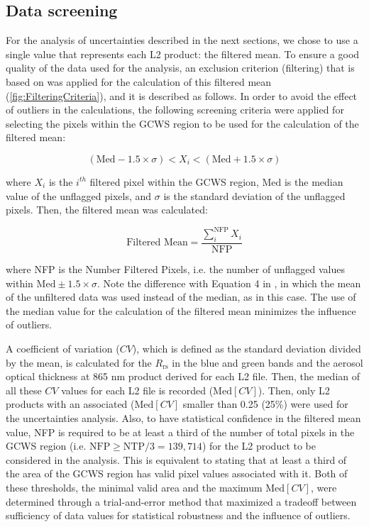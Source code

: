 \documentclass[remotesensing,article,submit,moreauthors,pdftex,10pt,a4paper]{Definitions/mdpi}
\begin{document}
\subsection{Data screening}
For the analysis of uncertainties described in the next sections, we chose to use a single value that represents each L2 product: the filtered mean. To ensure a good quality of the data used for the analysis, an exclusion criterion (filtering) that is based on \cite{Bailey2006} was applied for the calculation of this filtered mean (\autoref{fig:FilteringCriteria}), and it is described as follows. In order to avoid the effect of outliers in the calculations, the following screening criteria were applied for selecting the pixels within the GCWS region to be used for the calculation of the filtered mean: 
\begin{linenomath*}
\begin{equation}\label{eq:filtered_value}
  (\text{Med}-1.5\times\sigma) <  X_i < (\text{Med}+1.5\times\sigma)
\end{equation}
\end{linenomath*}
where $X_i$ is the $i^{th}$ filtered pixel within the GCWS region, $\text{Med}$ is the median value of the unflagged pixels, and $\sigma$ is the standard deviation of the unflagged pixels. Then, the filtered mean was calculated: 
\begin{linenomath*}
\begin{equation}\label{eq:filtered_mean}
  \text{Filtered Mean} =\frac{\displaystyle \sum_i^\text{NFP} X_i}{\text{NFP}}
\end{equation}
\end{linenomath*}
where NFP is the Number Filtered Pixels, i.e. the number of unflagged values within $\text{Med}\pm 1.5\times\sigma$. Note the difference with Equation 4 in \cite{Bailey2006}, in which the mean of the unfiltered data was used instead of the median, as in this case. The use of the median value for the calculation of the filtered mean minimizes the influence of outliers.

A coefficient of variation ($CV$), which is defined as the standard deviation divided by the mean, is calculated for the $R_\text{rs}$ in the blue and green bands and the aerosol optical thickness at 865 nm product derived for each L2 file. Then, the median of all these $CV$ values for each L2 file is recorded ($\text{Med}[CV]$). Then, only L2 products with an associated ($\text{Med}[CV]$ smaller than 0.25 (25\%) were used for the uncertainties analysis. Also, to have statistical confidence in the filtered mean value, NFP is required to be at least a third of the number of total pixels in the GCWS region (i.e. $\text{NFP}\geq \text{NTP}/3 = 139,714$) for the L2 product to be considered in the analysis. This is equivalent to stating that at least a third of the area of the GCWS region has valid pixel values associated with it. Both of these thresholds, the minimal valid area and the maximum $\text{Med}[CV]$, were determined through a trial-and-error method that maximized a tradeoff between sufficiency of data values for statistical robustness and the influence of outliers.
\end{document}
